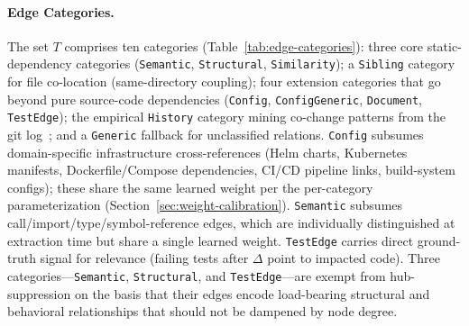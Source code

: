 \documentclass[11pt, a4paper]{article}
\begin{document}
\paragraph{Edge Categories.} The set $T$ comprises ten categories (Table~\ref{tab:edge-categories}): three core static-dependency categories (\texttt{Semantic}, \texttt{Structural}, \texttt{Similarity}); a \texttt{Sibling} category for file co-location (same-directory coupling); four extension categories that go beyond pure source-code dependencies (\texttt{Config}, \texttt{ConfigGeneric}, \texttt{Document}, \texttt{TestEdge}); the empirical \texttt{History} category mining co-change patterns from the git log~\cite{hassan2004predicting}; and a \texttt{Generic} fallback for unclassified relations. \texttt{Config} subsumes domain-specific infrastructure cross-references (Helm charts, Kubernetes manifests, Dockerfile/Compose dependencies, CI/CD pipeline links, build-system configs); these share the same learned weight per the per-category parameterization (Section~\ref{sec:weight-calibration}). \texttt{Semantic} subsumes call/import/type/symbol-reference edges, which are individually distinguished at extraction time but share a single learned weight. \texttt{TestEdge} carries direct ground-truth signal for relevance (failing tests after $\Delta$ point to impacted code). Three categories---\texttt{Semantic}, \texttt{Structural}, and \texttt{TestEdge}---are exempt from hub-suppression on the basis that their edges encode load-bearing structural and behavioral relationships that should not be dampened by node degree.
\end{document}
